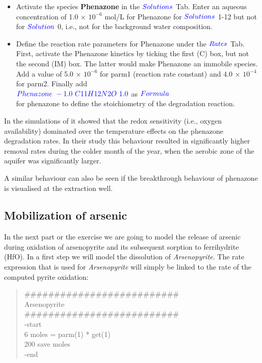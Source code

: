 \begin{itemize}

\item Activate the species {\color{red} \textbf{Phenazone}} 
in the ${\color{blue} Solutions}$ Tab.
Enter an aqueous concentration 
of 1.0 $\times$ $10^{-6}$ mol/L for Phenazone for  
${\color{blue} Solutions}$ 1-12 but not for
${\color{blue} Solution}$ 0, i.e., 
not for the background water composition.

\item Define the reaction rate parameters for Phenazone under the 
${\color{blue} Rates}$ Tab. First, activate the Phenazone kinetics 
by ticking the first (C) box, but not the second (IM) box.
The latter would make Phenazone an immobile species.
Add a value of 5.0 $\times$ $10^{-6}$ 
for parm1 (reaction rate constant) and 
4.0 $\times$ $10^{-4}$ for parm2. Finally add \\
${\color{blue} Phenazone\ -1.0\ C11H12N2O\ 1.0}$ as ${\color{blue} Formula}$ \\
for phenazone to define the stoichiometry of the degradation reaction.

\end{itemize}

In the simulations of \cite{greskowiak_2006} it showed that 
the redox sensitivity (i.e., oxygen availability) dominated 
over the temperature effects on the phenazone degradation rates.
In their study this behaviour resulted in significantly higher 
removal rates during the colder month of the year, 
when the aerobic zone of the aquifer was significantly larger. 

A similar behaviour can also be seen if the breakthrough behaviour of 
phenazone is visualised at the extraction well.    

\subsection[Mobilization of arsenic]{Mobilization of arsenic}

In the next part or the exercise we are going to model the release of arsenic 
during oxidation of arsenopyrite and its subsequent sorption to ferrihydrite (HfO). 
In a first step we will model the dissolution of \emph{Arsenopyrite}. 
The rate expression that is used for \emph{Arsenopyrite} will simply be linked
to the rate of the computed pyrite oxidation:

{\color{red}
\begin{quote}
\#\#\#\#\#\#\#\#\#\#\#\#\#\#\#\#\#\#\#\#\#\#\#\#\#\#\\
Arsenopyrite \\
\#\#\#\#\#\#\#\#\#\#\#\#\#\#\#\#\#\#\#\#\#\#\#\#\#\#\\
-start \\
  6 moles = parm(1) * get(1) \\
200 save moles \\
-end \\
\end{quote}}

